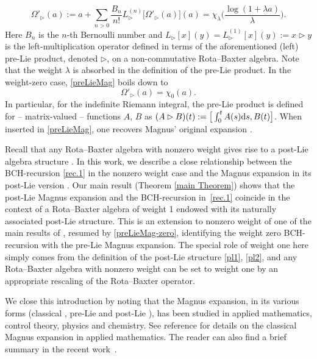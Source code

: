 \documentclass[10pt,a4paper]{amsart}
\numberwithin{equation}{section}
\begin{document}
\begin{equation}
\label{preLieMag}
\Omega'_\rhd(a)
:= a + \sum_{n>0} \frac{B_n}{n!} L^{(n)}_{\rhd}\big[\Omega'_\rhd(a)\big](a)
= \chi_{\lambda}\bigg( \frac{\log(1+\lambda a)}{\lambda}\bigg).
\end{equation}
Here $B_n$ is the $n$-th Bernoulli number and $L_{\rhd}[x](y)=L^{(1)}_{\rhd}[x](y):=x \rhd y$ is the left-multiplication operator defined in terms of the aforementioned (left) pre-Lie product, denoted $\rhd$, on a non-commutative Rota--Baxter algebra. Note that the weight $\lambda$ is absorbed in the definition of the pre-Lie product. In the weight-zero case, \eqref{preLieMag} boils down to
\begin{equation}
\label{preLieMag-zero}
\Omega'_\rhd(a)
= \chi_{0}(a).
\end{equation}
In particular, for the indefinite Riemann integral, the pre-Lie product is defined for -- matrix-valued -- functions $A$, $B$ as $(A \rhd B)(t):=\big[\int_0^tA(s){\rm d}s,B(t)\big]$. When inserted in \eqref{preLieMag}, one recovers Magnus' original expansion \cite{WM54}.

Recall that any Rota--Baxter algebra with nonzero weight gives rise to a post-Lie algebra structure \cite{BGN10}. In this work, we describe a close relationship between the BCH-recursion \eqref{rec.1} in the nonzero weight case and the Magnus expansion in its post-Lie version \cite{ELM2015, EI2018, EIM2017,Men2020}. Our main result (Theorem \ref{main Theorem}) shows that the post-Lie Magnus expansion and the BCH-recursion in~\eqref{rec.1} coincide in the context of a Rota--Baxter algebra of weight 1 endowed with its naturally associated post-Lie structure. This is an extension to nonzero weight of one of the main results of \cite{KLM06}, resumed by \eqref{preLieMag-zero}, identifying the weight zero BCH-recursion with the pre-Lie Magnus expansion. The special role of weight one here simply comes from the definition of the post-Lie structure \eqref{pl1}, \eqref{pl2}, and any Rota--Baxter algebra with nonzero weight can be set to weight one by an appropriate rescaling of the Rota--Baxter operator.

We close this introduction by noting that the Magnus expansion, in its various forms (classical \cite{WM54,MP1970}, pre-Lie \cite{AG81, CP13, KM08} and post-Lie \cite{ELM2015, EI2018, EIM2017,Men2020}), has been studied in applied mathematics, control theory, physics and chemistry. See reference \cite{BCOR08} for details on the classical Magnus expansion in applied mathematics. The reader can also find a brief summary in the recent work~\cite{CEO20}.
\end{document}
